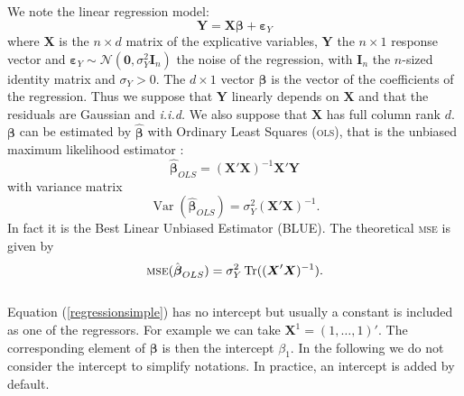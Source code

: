 \documentclass[12pt,a4paper]{report}
\begin{document}
We note the linear regression model:
\begin{equation}
		\boldsymbol{Y}%
		=\boldsymbol{X}\boldsymbol{\beta} + \boldsymbol{\varepsilon}_Y \label{regressionsimple}
	\end{equation}
	where $\boldsymbol{X}$ is the $n\times d$ matrix of the explicative variables, %
	 $\boldsymbol{Y}$ the  $n\times 1$ response vector and $\boldsymbol{\varepsilon}_Y \sim \mathcal{N}(\boldsymbol{0},\sigma_Y^2\boldsymbol{I}_n)$ the noise of the regression, with $\boldsymbol{I}_n$ the $n$-sized identity matrix and $\sigma_Y >0$. The $d\times 1$ vector $\boldsymbol{\beta}$ is the vector of the coefficients of the regression. Thus we suppose that $\boldsymbol{Y}$ linearly depends on $\boldsymbol{X}$ and that the residuals are Gaussian and {\it i.i.d.} We also suppose that $\boldsymbol{X}$ has full column rank $d$. 
	 $\boldsymbol{\beta}$ can be estimated by $\hat{\boldsymbol{\beta}}$ with Ordinary Least Squares (\textsc{ols}), that is the unbiased maximum likelihood estimator \cite{saporta2006probabilites,dodge2004analyse}: %
	\begin{equation}
		\boldsymbol{\hat{\beta}}_{OLS}=\left(\boldsymbol{X}'\boldsymbol{X} \right) ^{-1}\boldsymbol{X}'\boldsymbol{Y}\label{betaOLS}
	\end{equation}
	with variance matrix
	\begin{equation}
		\operatorname{Var}(\hat{\boldsymbol{\beta}}_{OLS})=\sigma_Y^2\left(\boldsymbol{X}'\boldsymbol{X} \right) ^{-1}. \label{eq:varOLS}
	\end{equation}
	 In fact it is the Best Linear Unbiased Estimator (BLUE).
	The theoretical \textsc{mse} is given by
	\begin{equation}
	\textsc{mse}(\hat{\boldsymbol{\beta}}_{OLS})= \sigma_Y^2 \operatorname{Tr}((\boldsymbol{X}'\boldsymbol{X})^{-1}). \nonumber 
	\end{equation}
	\\
	Equation (\ref{regressionsimple}) has no intercept but usually a constant is included as one of the regressors. For example we can take $\boldsymbol{X}^1=(1,\ldots,1)'$. The corresponding element of $\boldsymbol{\beta}$ is then the intercept $\beta_1$. In the following we do not consider the intercept to simplify notations. In practice, an intercept is added by default.\\
	
\end{document}
